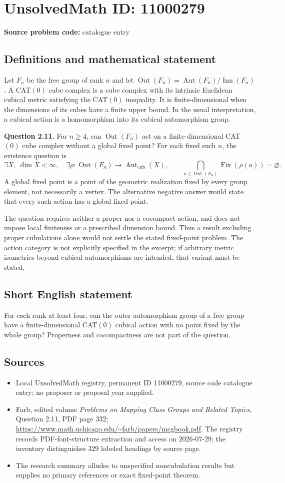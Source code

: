 \documentclass[11pt]{article}
\begin{document}
\section*{UnsolvedMath ID: 11000279}
\textbf{Source problem code:} catalogue entry
\subsection{Definitions and mathematical statement}
Let $F_n$ be the free group of rank $n$ and let $\operatorname{Out}(F_n)=\operatorname{Aut}(F_n)/\operatorname{Inn}(F_n)$. A CAT$(0)$ cube complex is a cube complex with its intrinsic Euclidean cubical metric satisfying the CAT$(0)$ inequality. It is finite-dimensional when the dimensions of its cubes have a finite upper bound. In the usual interpretation, a cubical action is a homomorphism into its cubical automorphism group.

\textbf{Question 2.11.} For $n\ge4$, can $\operatorname{Out}(F_n)$ act on a finite-dimensional CAT$(0)$ cube complex without a global fixed point? For each fixed such $n$, the existence question is
\[
 \exists X,\ \dim X<\infty,\quad
 \exists\rho:\operatorname{Out}(F_n)\to\operatorname{Aut}_{\mathrm{cub}}(X),
 \qquad\bigcap_{a\in\operatorname{Out}(F_n)}\operatorname{Fix}(\rho(a))=\varnothing.
\]
A global fixed point is a point of the geometric realization fixed by every group element, not necessarily a vertex. The alternative negative answer would state that every such action has a global fixed point.

The question requires neither a proper nor a cocompact action, and does not impose local finiteness or a prescribed dimension bound. Thus a result excluding proper cubulations alone would not settle the stated fixed-point problem. The action category is not explicitly specified in the excerpt; if arbitrary metric isometries beyond cubical automorphisms are intended, that variant must be stated.
\subsection{Short English statement}
For each rank at least four, can the outer automorphism group of a free group have a finite-dimensional CAT$(0)$ cubical action with no point fixed by the whole group? Properness and cocompactness are not part of the question.
\subsection{Sources}
\begin{itemize}
\item Local UnsolvedMath registry, permanent ID 11000279, source code catalogue entry; no proposer or proposal year supplied.
\item Farb, edited volume \emph{Problems on Mapping Class Groups and Related Topics}, Question 2.11, PDF page 332; \url{https://www.math.uchicago.edu/~farb/papers/mcgbook.pdf}. The registry records PDF-font-structure extraction and access on 2026-07-29; the inventory distinguishes 329 labeled headings by source page.
\item The research summary alludes to unspecified noncubulation results but supplies no primary references or exact fixed-point theorem.
\end{itemize}
\end{document}

